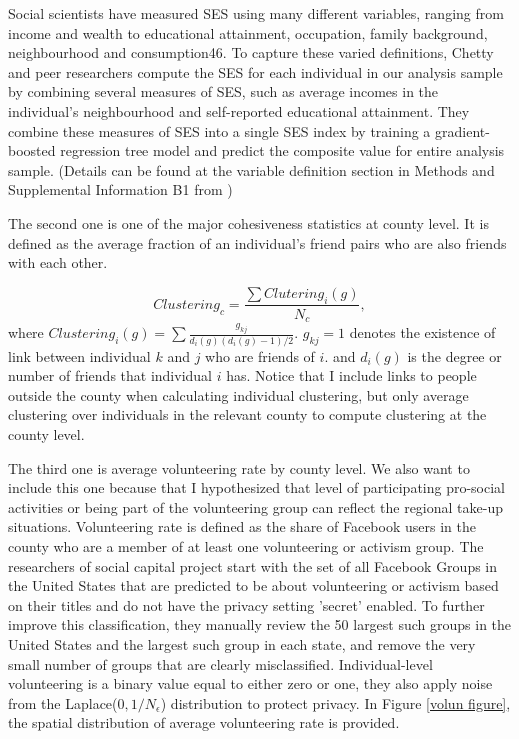\documentclass{article}
\begin{document}
Social scientists have measured SES using many different variables, ranging from income and wealth to educational attainment, occupation, family background, neighbourhood and consumption46. To capture these varied definitions, Chetty and peer researchers compute the SES for each individual in our analysis sample by combining several measures of SES, such as average incomes in the individual’s neighbourhood and self-reported educational attainment. They combine these measures of SES into a single SES index by training a gradient-boosted regression tree model and predict the composite value for entire analysis sample. (Details can be found at the variable definition section in Methods and Supplemental Information B1 from \cite{chetty2022social1})

The second one is one of the major cohesiveness statistics at county level. It is defined as the average fraction of an individual's friend pairs who are also friends with each other.

$$Clustering_c=\frac{\sum{Clutering_i(g)}}{N_c},$$
where $Clustering_i(g)=\sum{\frac{g_{kj}}{d_i(g)(d_i(g)-1)/2}}$. $g_{kj}=1$ denotes the existence of link between individual $k$ and $j$ who are friends of $i$. and $d_i(g)$ is the degree or number of friends that individual $i$ has. Notice that I include links to people outside the county when calculating individual clustering, but only average clustering
over individuals in the relevant county to compute clustering at the
county level.

The third one is average volunteering rate by county level.  We also want to include this one because that I hypothesized that level of participating pro-social activities or being part of the volunteering group can reflect the regional take-up situations. Volunteering rate is defined as the share of Facebook users in the county who are a member of at least one volunteering or activism group. The researchers of social capital project start with the set of all Facebook Groups in the United States that are predicted to be about volunteering or activism based on their titles and do not have the privacy setting 'secret' enabled. To further improve this classification, they manually review the 50 largest such groups in the United States and the largest such group in each state, and remove the very small number of groups that are clearly misclassified. Individual-level volunteering is a binary value equal to either zero or one, they also apply noise from the Laplace($0, 1/N_\epsilon$) distribution to protect privacy. In Figure \ref{volun figure}, the spatial distribution of average volunteering rate is provided.
\end{document}
